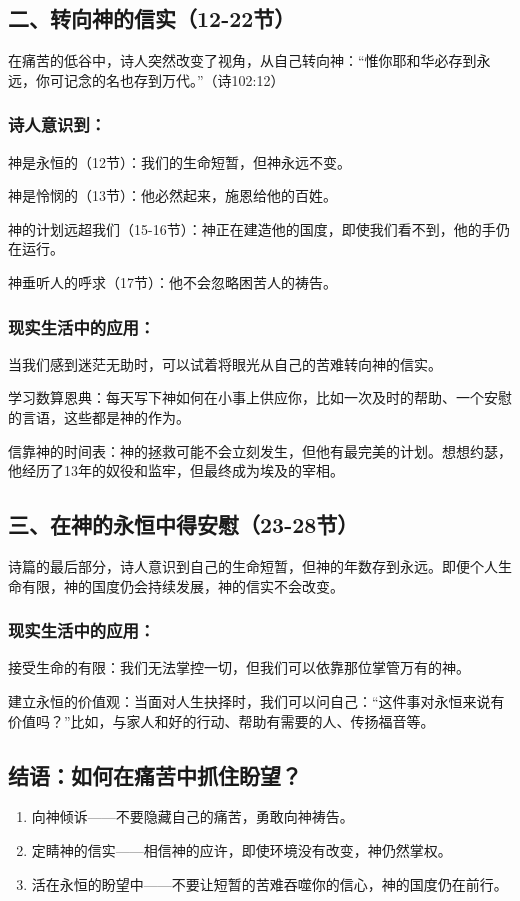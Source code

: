 \documentclass[a4paper, 12pt]{article}
\begin{document}
\subsection*{二、转向神的信实（12-22节）}
在痛苦的低谷中，诗人突然改变了视角，从自己转向神：“惟你耶和华必存到永远，你可记念的名也存到万代。”（诗102:12）

\subsubsection*{诗人意识到：}

\hspace{0.6cm}神是永恒的（12节）：我们的生命短暂，但神永远不变。

神是怜悯的（13节）：他必然起来，施恩给他的百姓。

神的计划远超我们（15-16节）：神正在建造他的国度，即使我们看不到，他的手仍在运行。

神垂听人的呼求（17节）：他不会忽略困苦人的祷告。

\subsubsection*{现实生活中的应用：}
当我们感到迷茫无助时，可以试着将眼光从自己的苦难转向神的信实。

学习数算恩典：每天写下神如何在小事上供应你，比如一次及时的帮助、一个安慰的言语，这些都是神的作为。

信靠神的时间表：神的拯救可能不会立刻发生，但他有最完美的计划。想想约瑟，他经历了13年的奴役和监牢，但最终成为埃及的宰相。
\subsection*{三、在神的永恒中得安慰（23-28节）}
诗篇的最后部分，诗人意识到自己的生命短暂，但神的年数存到永远。即便个人生命有限，神的国度仍会持续发展，神的信实不会改变。

\subsubsection*{现实生活中的应用：}

\hspace{0.6cm}接受生命的有限：我们无法掌控一切，但我们可以依靠那位掌管万有的神。

建立永恒的价值观：当面对人生抉择时，我们可以问自己：“这件事对永恒来说有价值吗？”比如，与家人和好的行动、帮助有需要的人、传扬福音等。
\subsection*{结语：如何在痛苦中抓住盼望？}
\begin{enumerate}
    \item 向神倾诉——不要隐藏自己的痛苦，勇敢向神祷告。

    \item 定睛神的信实——相信神的应许，即使环境没有改变，神仍然掌权。

    \item 活在永恒的盼望中——不要让短暂的苦难吞噬你的信心，神的国度仍在前行。

\end{enumerate}
\end{document}
